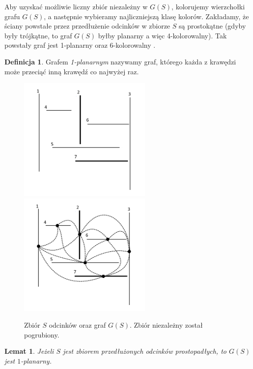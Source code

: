 \documentclass[brudnopis]{xmgr}
\newtheorem{Lemat}{Lemat}
\theoremstyle{definition}
\newtheorem{Definicja}{Definicja}
\begin{document}
\indent Aby uzyskać możliwie liczny zbiór niezależny w $G(S)$, kolorujemy wierzchołki grafu $G(S)$, a następnie wybieramy najliczniejszą klasę kolorów. Zakładamy, że ściany powstałe przez przedłużenie odcinków w zbiorze $S$ są prostokątne (gdyby były trójkątne, to graf $G(S)$ byłby planarny a więc 4-kolorowalny). 
Tak powstały graf jest 1-planarny oraz 6-kolorowalny \cite{borodin}.

\begin{Definicja}
  Grafem \emph{1-planarnym} nazywamy graf, którego każda z krawędzi może przeciąć inną krawędź co najwyżej raz.
\end{Definicja}
\begin{figure}[ht!]
  \centering
  \includegraphics[width=6.5cm]{rysunki/zbior_odcinkow.png}
  \includegraphics[width=6.5cm]{rysunki/graf_zbioru_odcinkow.png}
  \caption{Zbiór $S$ odcinków oraz graf $G(S)$. Zbiór niezależny został pogrubiony.}
  \label{fig:przedluzone odcinki}
\end{figure} 

\begin{Lemat} \cite{knadajniki}
  Jeżeli $S$ jest zbiorem przedłużonych odcinków prostopadłych, to $G(S)$ jest $1$-planarny.
\end{Lemat}
\end{document}
